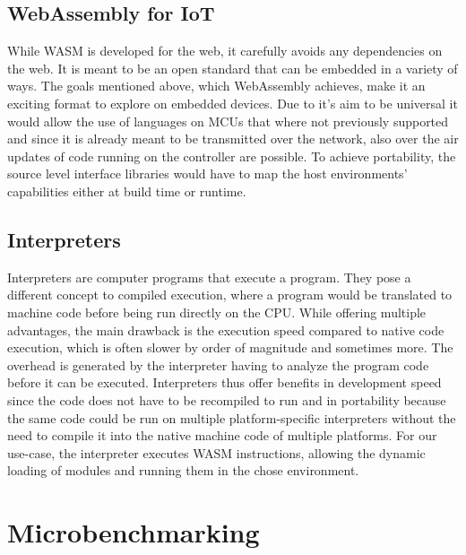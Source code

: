 \subsection{WebAssembly for IoT}
While WASM is developed for the web, it carefully avoids any dependencies on the web. It is meant to be an open standard that can be embedded in a variety of ways. The goals mentioned above, which WebAssembly achieves, make it an exciting format to explore on embedded devices. Due to it's aim to be universal it would allow the use of languages on MCUs that where not previously supported and since it is already meant to be transmitted over the network, also over the air updates of code running on the controller are possible. To achieve portability, the source level interface libraries would have to map the host environments' capabilities either at build time or runtime.
\subsection{Interpreters}
Interpreters are computer programs that execute a program. They pose a different concept to compiled execution, where a program would be translated to machine code before being run directly on the CPU. While offering multiple advantages, the main drawback is the execution speed compared to native code execution, which is often slower by order of magnitude and sometimes more. The overhead is generated by the interpreter having to analyze the program code before it can be executed.
Interpreters thus offer benefits in development speed since the code does not have to be recompiled to run and in portability because the same code could be run on multiple platform-specific interpreters without the need to compile it into the native machine code of multiple platforms. For our use-case, the interpreter executes WASM instructions, allowing the dynamic loading of modules and running them in the chose environment.
\section{Microbenchmarking}
